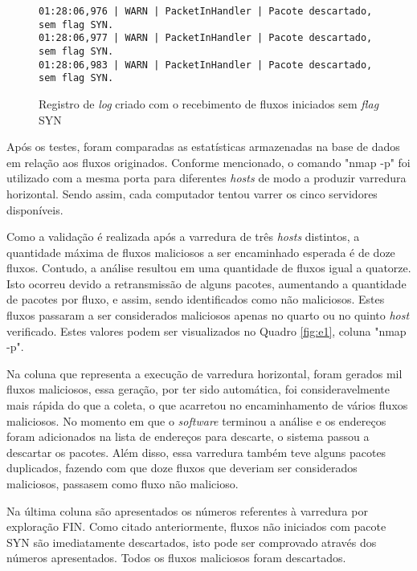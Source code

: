 \begin{figure}[H]
\centering
\caption{Registro de \textit{log} criado com o recebimento de fluxos iniciados sem \textit{flag} SYN}
\begin{lstlisting}[belowskip=-0.05\baselineskip]
01:28:06,976 | WARN | PacketInHandler | Pacote descartado, sem flag SYN.
01:28:06,977 | WARN | PacketInHandler | Pacote descartado, sem flag SYN.
01:28:06,983 | WARN | PacketInHandler | Pacote descartado, sem flag SYN.
\end{lstlisting}
\label{fig:logfin}
\end{figure}



Após os testes, foram comparadas as estatísticas armazenadas na base de dados em relação aos fluxos originados.
Conforme mencionado, o comando "nmap -p" foi utilizado com a mesma porta para diferentes \textit{hosts} de modo a produzir varredura horizontal. Sendo assim, cada computador tentou varrer os cinco servidores disponíveis.

Como a validação é realizada após a varredura de três \textit{hosts} distintos, a quantidade máxima de fluxos maliciosos a ser encaminhado esperada é de doze fluxos. Contudo, a análise resultou em uma quantidade de fluxos igual a quatorze. Isto ocorreu devido a retransmissão de alguns pacotes, aumentando a quantidade de pacotes por fluxo, e assim, sendo identificados como não maliciosos. Estes fluxos passaram a ser considerados maliciosos apenas no quarto ou no quinto \textit{host} verificado. Estes valores podem ser visualizados no Quadro \ref{fig:e1}, coluna "nmap -p".

Na coluna que representa a execução de varredura horizontal, foram gerados mil fluxos maliciosos, essa geração, por ter sido automática, foi consideravelmente mais rápida do que a coleta, o que acarretou no encaminhamento de vários fluxos maliciosos. No momento em que o \textit{software} terminou a análise e os endereços foram adicionados na lista de endereços para descarte, o sistema passou a descartar os pacotes. Além disso, essa varredura também teve alguns pacotes duplicados, fazendo com que doze fluxos que deveriam ser considerados maliciosos, passasem como fluxo não malicioso.

Na última coluna são apresentados os números referentes à varredura por exploração FIN. Como citado anteriormente, fluxos não iniciados com pacote SYN são imediatamente descartados, isto pode ser comprovado através dos números apresentados. Todos os fluxos maliciosos foram descartados.

